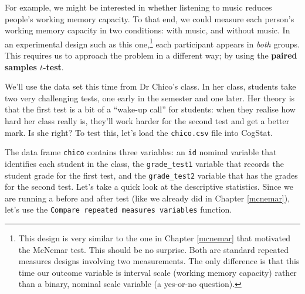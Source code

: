 \documentclass[
  11pt,
  a4paper,
  twoside,symmetric,openright]{book}
\theoremstyle{break}
\theoremstyle{break}
\begin{document}
For example, we might be interested in whether listening to music reduces people's working memory capacity. To that end, we could measure each person's working memory capacity in two conditions: with music, and without music. In an experimental design such as this one,\footnote{This design is very similar to the one in Chapter \ref{mcnemar} that motivated the McNemar test. This should be no surprise. Both are standard repeated measures designs involving two measurements. The only difference is that this time our outcome variable is interval scale (working memory capacity) rather than a binary, nominal scale variable (a yes-or-no question).} each participant appears in \emph{both} groups. This requires us to approach the problem in a different way; by using the \textbf{paired samples \(t\)-test}.

We'll use the data set this time from Dr Chico's class. In her class, students take two very challenging tests, one early in the semester and one later. Her theory is that the first test is a bit of a ``wake-up call'' for students: when they realise how hard her class really is, they'll work harder for the second test and get a better mark. Is she right? To test this, let's load the \texttt{chico.csv} file into CogStat.

The data frame \texttt{chico} contains three variables: an \texttt{id} nominal variable that identifies each student in the class, the \texttt{grade\_test1} variable that records the student grade for the first test, and the \texttt{grade\_test2} variable that has the grades for the second test. Let's take a quick look at the descriptive statistics. Since we are running a before and after test (like we already did in Chapter \ref{mcnemar}), let's use the \texttt{Compare\ repeated\ measures\ variables} function.
\end{document}
